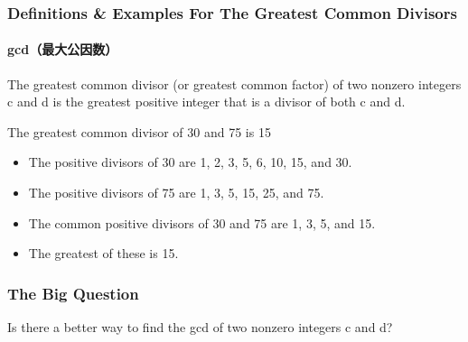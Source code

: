 \documentclass[
	11pt, %
]{beamer}
\begin{document}

\begin{frame}
	\frametitle{Definitions \& Examples For The Greatest Common Divisors}
	\framesubtitle{gcd（最大公因数）}
	
	\begin{definition}
	The greatest common divisor (or greatest common factor) of two
nonzero integers c and d is the greatest positive integer that is a divisor of
both c and d.
	\end{definition}
	
	\smallskip %
	
	\begin{example}
	The greatest common divisor of 30 and 75 is 15
		\begin{itemize}
			\item The positive divisors of 30 are 1, 2, 3, 5, 6, 10, 15, and 30.
			\item The positive divisors of 75 are 1, 3, 5, 15, 25, and 75.
			\item The common positive divisors of 30 and 75 are 1, 3, 5, and 15.
			\item The greatest of these is 15.
		\end{itemize}
	\end{example}
\end{frame}


\begin{frame}
	\frametitle{The Big Question}
	\bigskip
	{\LARGE Is there a better way to find the gcd of two nonzero integers c and d?}
	\bigskip
\end{frame}

\end{document}
